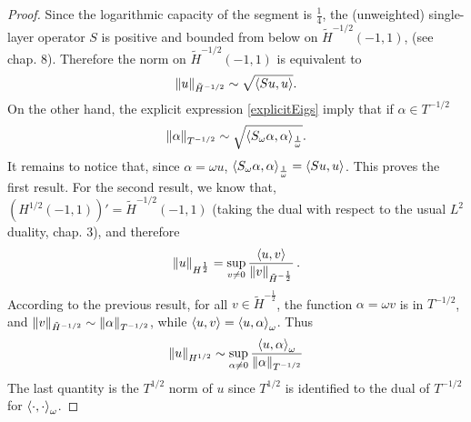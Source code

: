 \documentclass[a4paper]{article}
\begin{document}
\begin{proof}
	Since the logarithmic capacity of the segment is $\frac{1}{4}$, the (unweighted) single-layer operator $S$ is positive and bounded from below on $\tilde{H}^{-1/2}(-1,1)$, (see \cite{mclean2000strongly} chap. 8). Therefore the norm on $\tilde{H}^{-1/2}(-1,1)$ is equivalent to 
	\[\left\|u\right\|_{\tilde{H}^{-1/2}} \sim \sqrt{\left\langle Su,u\right\rangle}.\]
	On the other hand, the explicit expression \eqref{explicitEigs} imply that if $\alpha\in T^{-1/2}$
	\[ \left\|\alpha\right\|_{T^{-1/2}} \sim \sqrt{\left\langle S_\omega \alpha,\alpha\right\rangle_\frac{1}{\omega}}.\]
	It remains to notice that, since $\alpha=\omega u$, $\left\langle S_\omega \alpha,\alpha\right\rangle_\frac{1}{\omega} = \left\langle Su,u\right\rangle$. This proves the first result. For the second result, we know that, $(H^{1/2}(-1,1))' =  \tilde{H}^{-1/2}(-1,1)$ (taking the dual with respect to the usual $L^2$ duality, \cite{mclean1986spectral} chap. 3), and therefore
	\[\left\|u\right\|_{H^{\frac{1}{2}}} = \sup_{ v\neq 0} \dfrac{\left\langle u,v\right\rangle}{\left\|v\right\|_{\tilde{H}^{-\frac{1}{2}}}}\,.\]
	According to the previous result, for all $v\in \tilde{H}^{-\frac{1}{2}}$, the function $\alpha = \omega v$ is in $T^{-1/2}$, and $\left\| v\right\|_{\tilde{H}^{-1/2}} \sim \left\|\alpha\right\|_{T^{-1/2}}$, while $\left\langle u,v\right\rangle = \left\langle u,\alpha\right\rangle_\omega$. Thus 
	\[\left\|u\right\|_{H^{1/2}} \sim \sup_{\alpha \neq 0} \dfrac{\left\langle u,\alpha\right\rangle_\omega}{\left\|\alpha\right\|_{T^{-1/2}}}\]
	The last quantity is the $T^{1/2}$ norm of $u$ since $T^{1/2}$ is identified to the dual of $T^{-1/2}$ for $\left\langle \cdot,\cdot\right\rangle_\omega$.
	
\end{proof}
\end{document}
